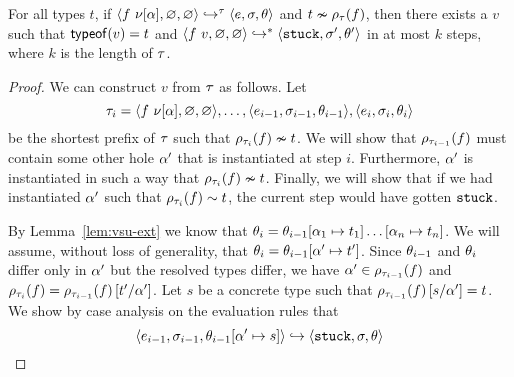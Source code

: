 \begin{lem}
\label{lem:k-stuck}
For all types $t$,
if $\steptr{\trace}{\eapp{f}{\vhole{\thole}}}{\emptysu}{\emptysu}{e}{\vsu}{\tsu}$ and
   $\tincompat{t}{\ptype{\trace}{f}}$,
   then there exists a $v$ such that $\hastype{v}{t}$ and
   $\steps{\eapp{f}{v}}{\emptysu}{\emptysu}{\stuck}{\vsu'}{\tsu'}$ in at most
   $k$ steps, where $k$ is the length of $\trace$.
\end{lem}
\begin{proof}
  We can construct $v$ from $\trace$ as follows.
  Let
  $$
  \trace_i = \triple{\eapp{f}{\vhole{\thole}}}{\emptysu}{\emptysu},
             \ldots,
             \triple{e_{i-1}}{\vsu_{i-1}}{\tsu_{i-1}},
             \triple{e_{i}}{\vsu_{i}}{\tsu_{i}}
  $$
  be the shortest prefix of $\trace$ such that
  $\tincompat{\ptype{\trace_i}{f}}{t}$.
  We will show that $\ptype{\trace_{i-1}}{f}$ %
  must contain some other hole $\thole'$ that is
  instantiated at step $i$.
  Furthermore, $\thole'$ is instantiated in such a way that
  $\tincompat{\ptype{\trace_i}{f}}{t}$.
  Finally, we will show that if we had instantiated $\thole'$ such that
  $\tcompat{\ptype{\trace_i}{f}}{t}$,
  the current step would have gotten $\stuck$.


  By Lemma~\ref{lem:vsu-ext} we know that
  $\tsu_{i} = \tsu_{i-1}[\thole_1 \mapsto t_1] \ldots [\thole_n \mapsto t_n]$.
  We will assume, without loss of generality, that
  $\tsu_{i} = \tsu_{i-1}[\thole' \mapsto t']$.
  Since $\tsu_{i-1}$ and $\tsu_{i}$ differ only in $\thole'$ but the resolved
  types differ, we have
  $\thole' \in \ptype{\trace_{i-1}}{f}$
  and
  $\ptype{\trace_i}{f} = \ptype{\trace_{i-1}}{f}\sub{\thole'}{t'}$.
  Let $s$ be a
  concrete type such that $\ptype{\trace_{i-1}}{f}\sub{\thole'}{s} = t$.
  We show by case analysis on the evaluation rules that
  $$\step{e_{i-1}}{\vsu_{i-1}}{\tsu_{i-1}[\thole' \mapsto s]}{\stuck}{\vsu}{\tsu}$$


\end{proof}
